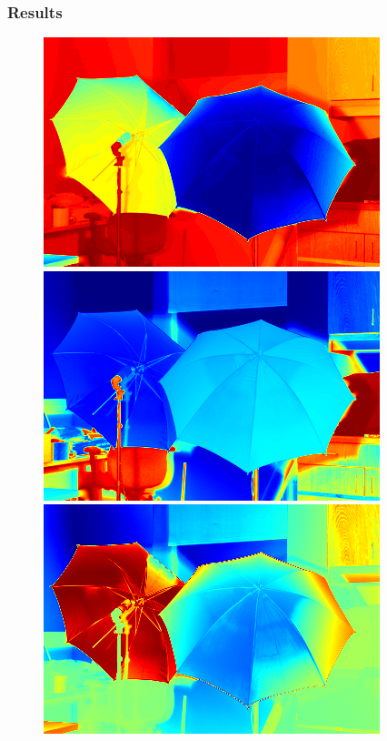 \documentclass{beamer}
\begin{document}
\begin{frame}
  \frametitle{Results}
  \begin{figure}[ht]
    \begin{minipage}[b]{0.40\linewidth}
      \centering
      \includegraphics[width=\textwidth]{./Images/Umbrella/evecColor.png}
    \end{minipage}
    \begin{minipage}[b]{0.40\linewidth}
      \centering
      \includegraphics[width=\textwidth]{./Images/Umbrella/evec2.png}
    \end{minipage}
    \vfill
    \begin{minipage}[b]{0.40\linewidth}
      \centering
      \includegraphics[width=\textwidth]{./Images/Umbrella/evec3.png}

\end{minipage}
\end{figure}
\end{frame}
\end{document}
